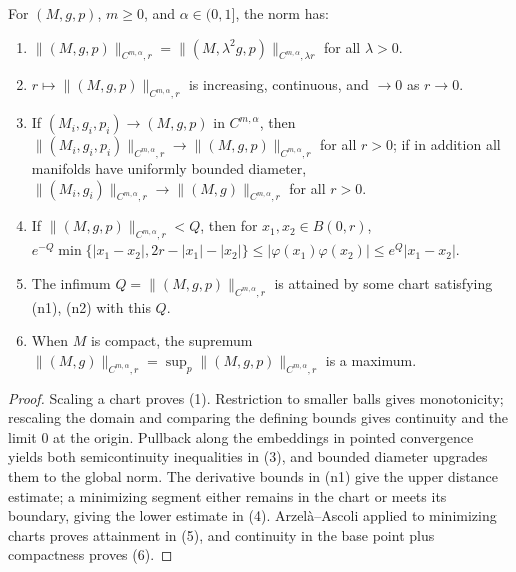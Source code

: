 \begin{proposition}
  \label{prop:pet-ch11-norm-properties}

  For $(M,g,p)$, $m\ge0$, and $\alpha\in(0,1]$, the norm has:
  \begin{enumerate}
  \item[(1)] $\|(M,g,p)\|_{C^{m,\alpha},r}=\|(M,\lambda^2g,p)\|_{C^{m,\alpha},\lambda r}$ for all $\lambda>0$.
  \item[(2)] $r\mapsto\|(M,g,p)\|_{C^{m,\alpha},r}$ is increasing, continuous, and $\to0$ as $r\to0$.
  \item[(3)] If $(M_i,g_i,p_i)\to(M,g,p)$ in $C^{m,\alpha}$, then
    $\|(M_i,g_i,p_i)\|_{C^{m,\alpha},r}\to\|(M,g,p)\|_{C^{m,\alpha},r}$ for all $r>0$;
    if in addition all manifolds have uniformly bounded diameter,
    $\|(M_i,g_i)\|_{C^{m,\alpha},r}\to\|(M,g)\|_{C^{m,\alpha},r}$ for all $r>0$.
  \item[(4)] If $\|(M,g,p)\|_{C^{m,\alpha},r}<Q$, then for $x_1,x_2\in B(0,r)$,
    $e^{-Q}\min\{|x_1-x_2|,2r-|x_1|-|x_2|\}\le|\varphi(x_1)\varphi(x_2)|\le e^Q|x_1-x_2|$.
  \item[(5)] The infimum $Q=\|(M,g,p)\|_{C^{m,\alpha},r}$ is attained by some
    chart satisfying (n1), (n2) with this $Q$.
  \item[(6)] When $M$ is compact, the supremum $\|(M,g)\|_{C^{m,\alpha},r}=\sup_p\|(M,g,p)\|_{C^{m,\alpha},r}$ is a maximum.
  \end{enumerate}
\end{proposition}
\begin{proof}
  \sketch
  Scaling a chart proves (1). Restriction to smaller balls gives monotonicity; rescaling the domain and comparing the defining bounds gives continuity and the limit \(0\) at the origin. Pullback along the embeddings in pointed convergence yields both semicontinuity inequalities in (3), and bounded diameter upgrades them to the global norm. The derivative bounds in (n1) give the upper distance estimate; a minimizing segment either remains in the chart or meets its boundary, giving the lower estimate in (4). Arzelà--Ascoli applied to minimizing charts proves attainment in (5), and continuity in the base point plus compactness proves (6).
\end{proof}


